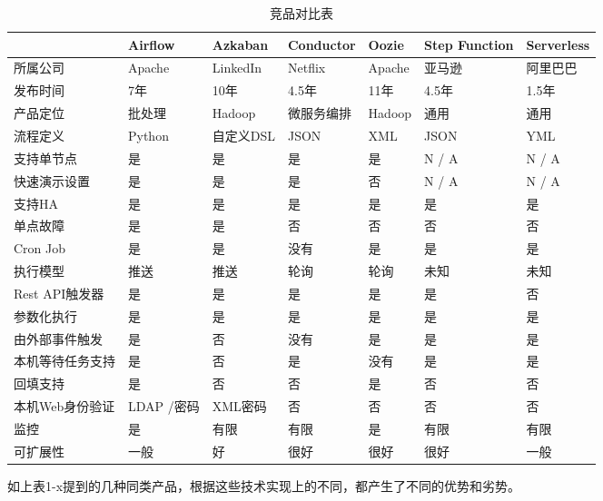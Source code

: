 \begin{table}[H]
\centering
\caption{竞品对比表}
\label{tab:compare-1}
\begin{tabular}{lllllll}
\toprule
&Airflow	&Azkaban	&Conductor	&Oozie	&Step Function	&Serverless \\
\midrule
所属公司& Apache& LinkedIn& Netflix& Apache& 亚马逊& 阿里巴巴 \\
发布时间&	7年&	10年&	4.5年&	11年&	4.5年&	1.5年 \\
产品定位&	批处理&	Hadoop&	微服务编排&	Hadoop&	通用&	通用 \\
流程定义&	Python&	自定义DSL&	JSON&	XML&	JSON&	YML \\
支持单节点&	是&	是&	是&	是&	N / A&	N / A \\
快速演示设置&	是&	是&	是&	否&	N / A&	N / A \\
支持HA&	是&	是&	是&	是&	是&	是 \\
单点故障&	是&	是&	否&	否&	否&	否 \\
Cron Job&	是&	是&	没有&	是&	是&	是 \\
执行模型&	推送&	推送&	轮询&	轮询&	未知&	未知 \\
Rest API触发器&	是&	是&	是&	是&	是&	否 \\
参数化执行&	是&	是&	是&	是&	是&	是 \\
由外部事件触发&	是&	否&	没有&	是&	是&	是 \\
本机等待任务支持&	是&	否&	是&	没有&	是&	是 \\
回填支持&	是&	否&	否&	是&	否&	否 \\
本机Web身份验证&	LDAP /密码&	XML密码&	否&	否&	否&	否 \\
监控&	是&	有限&	有限&	是&	有限&	有限 \\
可扩展性&	一般&	好&	很好&	很好&	很好&	一般\\
\bottomrule
\end{tabular}
\end{table}

如上表1-x提到的几种同类产品，根据这些技术实现上的不同，都产生了不同的优势和劣势。

